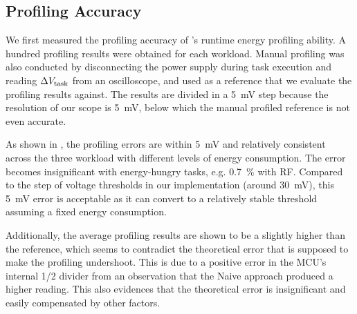 
\subsection{Profiling Accuracy}



We first measured the profiling accuracy of \nn{}'s runtime energy profiling ability. 
A hundred profiling results were obtained for each workload. 
Manual profiling was also conducted by disconnecting the power supply during task execution and reading $\Delta V_{\text{task}}$ from an oscilloscope, and used as a reference that we evaluate the profiling results against. 
The results are divided in a \SI{5}{\milli\volt} step because the resolution of our scope is \SI{5}{\milli\volt}, below which the manual profiled reference is not even accurate. 

As shown in , the profiling errors are within \SI{5}{\milli\volt} and relatively consistent across the three workload with different levels of energy consumption. 
The error becomes insignificant with energy-hungry tasks, e.g. \SI{0.7}{\percent} with RF. 
Compared to the step of voltage thresholds in our implementation (around \SI{30}{\milli\volt}), this \SI{5}{\milli\volt} error is acceptable as it can convert to a relatively stable threshold assuming a fixed energy consumption. 

Additionally, the average profiling results are shown to be a slightly higher than the reference, which 
seems to contradict the theoretical error that is supposed to make the profiling undershoot.
This is due to a positive error in the MCU's internal 1/2  divider from an observation that the Naive approach produced a higher reading. 
This also evidences that the theoretical error is insignificant and easily compensated by other factors. 


